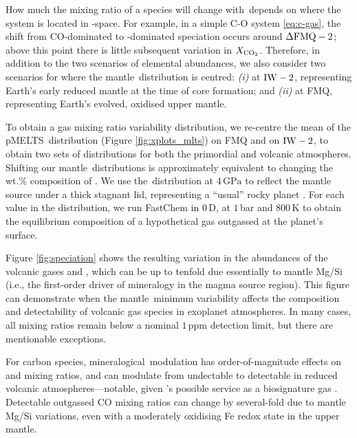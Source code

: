 How much the mixing ratio of a species will change with \fo\,depends on where the system is located in \fo-space. For example, in a simple C-O system \eqref{eq:c-gas}, the shift from CO-dominated to -dominated speciation occurs around ${\rm \Delta FMQ} - 2$; above this point there is little subsequent variation in $X_{\ce{CO2}}$. Therefore, in addition to the two scenarios of elemental abundances, we also consider two scenarios for where the mantle \fo\,distribution is centred: \textit{(i)} at ${\rm IW} - 2$, representing Earth's early reduced mantle at the time of core formation; and \textit{(ii)} at FMQ, representing Earth's evolved, oxidised upper mantle. 

To obtain a gas mixing ratio variability distribution, we re-centre the mean of the pMELTS \fo\,distribution (Figure \ref{fig:xplots_mlts}) on FMQ and on ${\rm IW} - 2$, to obtain two sets of \fo distributions for both the primordial and volcanic atmospheres. Shifting our mantle \fo\,distributions is approximately equivalent to changing the wt.\% composition of . We use the \fo\,distribution at $4\,\text{GPa}$ to reflect the mantle source under a thick stagnant lid, representing a ``usual'' rocky planet \citep{stern_stagnant_2018}. For each \fo\,value in the distribution, we run FastChem in $0$\,D, at $1$\,bar and $800$\,K to obtain the equilibrium composition of a hypothetical gas outgassed at the planet's surface. 

Figure \ref{fig:speciation} shows the resulting variation in the abundances of the volcanic gases  and , which can be up to tenfold due essentially to mantle Mg/Si (i.e., the first-order driver of mineralogy in the magma source region). This figure can demonstrate when the mantle \fo\,minimum variability affects the composition and detectability of volcanic gas species in exoplanet atmospheres. In many cases, all mixing ratios remain below a nominal $1\,\text{ppm}$ detection limit, but there are mentionable exceptions.

For carbon species, mineralogical \fo\,modulation has order-of-magnitude effects on  and  mixing ratios, and can modulate  from undectable to detectable in reduced volcanic atmospheres---notable, given 's possible service as a biosignature gas \citep[e.g.,][]{wogan_abundant_2020}. Detectable outgassed CO mixing ratios can change by several-fold due to mantle Mg/Si variations, even with a moderately oxidising Fe redox state in the upper mantle. 

